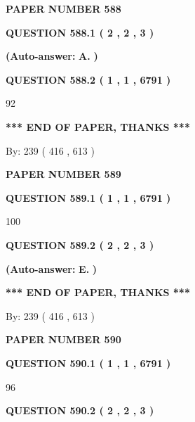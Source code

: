 \documentclass{ctexart}
\begin{document}
   
\newpage 
\setcounter{page}{ 
   588001 } 
   
   
 {\textbf{ \Large{ PAPER NUMBER  588  }}}
   
   
   
   
  
  
{\textbf{\large{QUESTION
588.1 
 ( 2 , 2 , 3 )
}}}
 
 
{\textbf{(Auto-answer:}}
{\textbf{\large{
A.}}}
{\textbf{)}}
 
 
  
  
{\textbf{\large{QUESTION
588.2 
 ( 1 , 1 , 6791 )
}}}

92
   
   
   
   
\vspace{1.0in} 
{\textbf{\large{ *** END OF PAPER, THANKS *** }}} 
   
   
\hspace{1.0in} By: 
 239 ( 416 ,  613 )
   
   
   
   
\newpage 
\setcounter{page}{ 
   589001 } 
   
   
 {\textbf{ \Large{ PAPER NUMBER  589  }}}
   
   
   
   
  
  
{\textbf{\large{QUESTION
589.1 
 ( 1 , 1 , 6791 )
}}}

100
  
  
{\textbf{\large{QUESTION
589.2 
 ( 2 , 2 , 3 )
}}}
 
 
{\textbf{(Auto-answer:}}
{\textbf{\large{
E.}}}
{\textbf{)}}
 
 
   
   
   
   
\vspace{1.0in} 
{\textbf{\large{ *** END OF PAPER, THANKS *** }}} 
   
   
\hspace{1.0in} By: 
 239 ( 416 ,  613 )
   
   
   
   
\newpage 
\setcounter{page}{ 
   590001 } 
   
   
 {\textbf{ \Large{ PAPER NUMBER  590  }}}
   
   
   
   
  
  
{\textbf{\large{QUESTION
590.1 
 ( 1 , 1 , 6791 )
}}}

96
  
  
{\textbf{\large{QUESTION
590.2 
 ( 2 , 2 , 3 )
}}}
 
\end{document}
